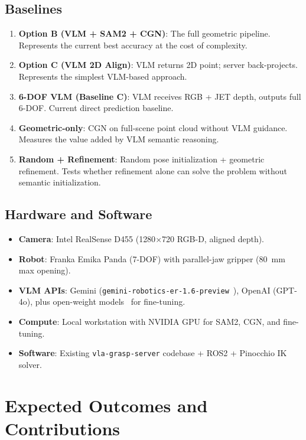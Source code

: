 \documentclass[11pt,a4paper]{article}
\begin{document}
\subsection{Baselines}

\begin{enumerate}[leftmargin=*]
    \item \textbf{Option B (VLM + SAM2 + CGN)}: The full geometric pipeline. Represents the current best accuracy at the cost of complexity.
    \item \textbf{Option C (VLM 2D Align)}: VLM returns 2D point; server back-projects. Represents the simplest VLM-based approach.
    \item \textbf{6-DOF VLM (Baseline C)}: VLM receives RGB + JET depth, outputs full 6-DOF. Current direct prediction baseline.
    \item \textbf{Geometric-only}: CGN on full-scene point cloud without VLM guidance. Measures the value added by VLM semantic reasoning.
    \item \textbf{Random + Refinement}: Random pose initialization + geometric refinement. Tests whether refinement alone can solve the problem without semantic initialization.
\end{enumerate}

\subsection{Hardware and Software}

\begin{itemize}[nosep]
    \item \textbf{Camera}: Intel RealSense D455 (1280$\times$720 RGB-D, aligned depth).
    \item \textbf{Robot}: Franka Emika Panda (7-DOF) with parallel-jaw gripper (80~mm max opening).
    \item \textbf{VLM APIs}: Gemini (\texttt{gemini-robotics-er-1.6-preview}~\cite{gemini2025robotics}), OpenAI (GPT-4o), plus open-weight models~\cite{deitke2025molmo} for fine-tuning.
    \item \textbf{Compute}: Local workstation with NVIDIA GPU for SAM2, CGN, and fine-tuning.
    \item \textbf{Software}: Existing \texttt{vla-grasp-server} codebase + ROS2 + Pinocchio IK solver.
\end{itemize}

\section{Expected Outcomes and Contributions}
\end{document}
